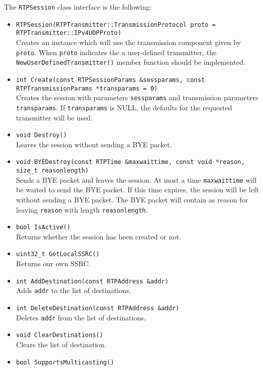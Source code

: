 \documentclass[12pt,a4paper]{article}
\begin{document}
				The {\tt RTPSession} class interface is the following:
				\begin{itemize}
					\item {\tt RTPSession(RTPTransmitter::Transmission\-Protocol proto = RTP\-Trans\-mitter::IPv4\-UDPProto)}\\
						Creates an instance which will use the transmission component given
						by {\tt proto}. When {\tt proto} indicates the a user-defined
						transmitter, the {\tt NewUserDefinedTransmitter()} member
						function should be implemented.
					\item {\tt int Create(const RTPSessionParams \&sessparams, const RTPTransmissionParams *transparams = 0)}\\
						Creates the session with parameters {\tt sessparams} and transmission parameters {\tt transparams}.
						If {\tt transparams} is NULL, the defaults for the requested transmitter will
						be used.
					\item {\tt void Destroy()}\\
						Leaves the session without sending a BYE packet.
					\item {\tt void BYEDestroy(const RTPTime \&maxwaittime, const void *reason, size\_t reasonlength)}\\
						Sends a BYE packet and leaves the session. At most a time {\tt maxwaittime} will
						be waited to send the BYE packet. If this time expires, the session will be
						left without sending a BYE packet. The BYE packet will contain as reason for
						leaving {\tt reason} with length {\tt reasonlength}.
					\item {\tt bool IsActive()}\\
						Returns whether the session has been created or not.
					\item {\tt uint32\_t GetLocalSSRC()}\\
						Returns our own SSRC.
					\item {\tt int AddDestination(const RTPAddress \&addr)}\\
						Adds {\tt addr} to the list of destinations.
					\item {\tt int DeleteDestination(const RTPAddress \&addr)}\\
						Deletes {\tt addr} from the list of destinations.
					\item {\tt void ClearDestinations()}\\
						Clears the list of destination.
					\item {\tt bool SupportsMulticasting()}\\

\end{itemize}
\end{document}
